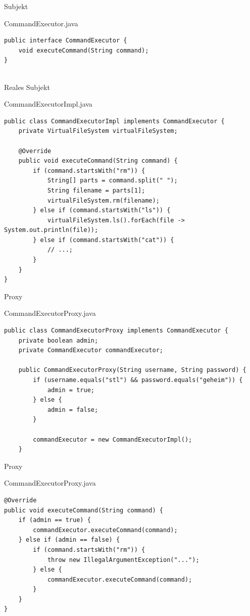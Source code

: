 \begin{frame}[fragile]{Subjekt}
	\begin{exampleblock}{CommandExecutor.java}
        \begin{lstlisting}
public interface CommandExecutor {
	void executeCommand(String command);
}
    
        \end{lstlisting}
 	\end{exampleblock}
\end{frame}

\begin{frame}[fragile]{Reales Subjekt}
	\begin{exampleblock}{CommandExecutorImpl.java}
        \begin{lstlisting}
public class CommandExecutorImpl implements CommandExecutor {
	private VirtualFileSystem virtualFileSystem;
	
	@Override
	public void executeCommand(String command) {
		if (command.startsWith("rm")) {
			String[] parts = command.split(" ");
			String filename = parts[1];
			virtualFileSystem.rm(filename);
		} else if (command.startsWith("ls")) {
			virtualFileSystem.ls().forEach(file -> System.out.println(file));
		} else if (command.startsWith("cat")) {
			// ...;
		}
	}
}
        \end{lstlisting}
 	\end{exampleblock}
\end{frame}

\begin{frame}[fragile]{Proxy}
	\begin{exampleblock}{CommandExecutorProxy.java}
        \begin{lstlisting}
public class CommandExecutorProxy implements CommandExecutor {
	private boolean admin;
	private CommandExecutor commandExecutor;
	
	public CommandExecutorProxy(String username, String password) {
		if (username.equals("stl") && password.equals("geheim")) {
			admin = true;
		} else {
			admin = false;
		}
		
		commandExecutor = new CommandExecutorImpl();
	}     
        \end{lstlisting}
 	\end{exampleblock}
\end{frame}

\begin{frame}[fragile]{Proxy}
	\begin{exampleblock}{CommandExecutorProxy.java}
        \begin{lstlisting}
@Override
public void executeCommand(String command) {
    if (admin == true) {
        commandExecutor.executeCommand(command);
    } else if (admin == false) {
        if (command.startsWith("rm")) {
            throw new IllegalArgumentException("...");
        } else {
            commandExecutor.executeCommand(command);
        }
    }
}
        \end{lstlisting}
 	\end{exampleblock}
\end{frame}

